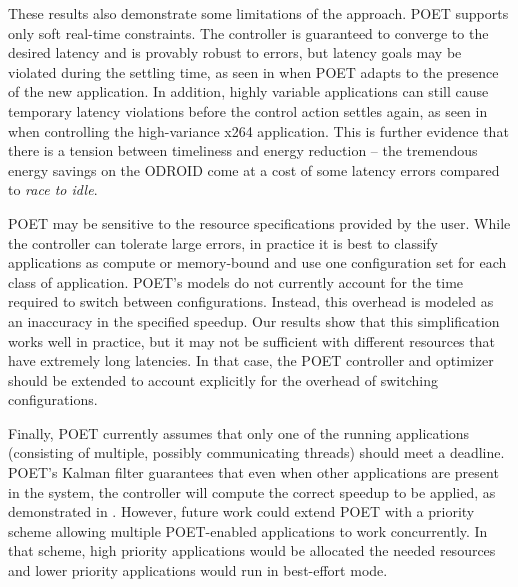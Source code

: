 These results also demonstrate some limitations of the approach.
POET supports only soft real-time constraints.
The controller is guaranteed to converge to the desired latency and is provably robust to errors, but latency goals may be violated during the settling time, as seen in  when POET adapts to the presence of the new application.
In addition, highly variable applications can still cause temporary latency violations before the control action settles again, as seen in  when controlling the high-variance x264 application.
This is further evidence that there is a tension between timeliness and energy reduction \cite{Abeni} -- the tremendous energy savings on the ODROID come at a cost of some latency errors compared to \emph{race to idle}.


POET may be sensitive to the resource specifications provided by the user.
While the controller can tolerate large errors, in practice it is best to classify applications as compute or memory-bound and use one configuration set for each class of application.
POET's models do not currently account for the time required to switch between configurations.
Instead, this overhead is modeled as an inaccuracy in the specified speedup.
Our results show that this simplification works well in practice, but it may not be sufficient with different resources that have extremely long latencies.
In that case, the POET controller and optimizer should be extended to account explicitly for the overhead of switching configurations.
 
Finally, POET currently assumes that only one of the running applications (consisting of multiple, possibly communicating threads) should meet a deadline.
POET's Kalman filter guarantees that even when other applications are present in the system, the controller will compute the correct speedup to be applied, as demonstrated in .
However, future work could extend POET with a priority scheme allowing multiple POET-enabled applications to work concurrently.
In that scheme, high priority applications would be allocated the needed resources and lower priority applications would run in best-effort mode.
